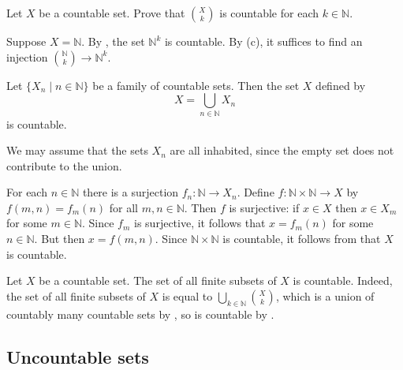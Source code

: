 
\begin{exercise} \label{exFiniteSubsetsCountableFixedSize}
Let $X$ be a countable set. Prove that $\binom{X}{k}$ is countable for each $k \in \mathbb{N}$.
\begin{backhint}
Suppose $X=\mathbb{N}$. By , the set $\mathbb{N}^k$ is countable. By (c), it suffices to find an injection $\binom{\mathbb{N}}{k} \to \mathbb{N}^k$.
\end{backhint}
\end{exercise}

\begin{theorem}
\label{thmCountableUnionOfCountableSetIsCountable}
Let $\{ X_n \mid n \in \mathbb{N} \}$ be a family of countable sets. Then the set $X$ defined by
\[ X = \bigcup_{n \in \mathbb{N}} X_n \]
is countable.
\end{theorem}

\begin{cproof}
We may assume that the sets $X_n$ are all inhabited, since the empty set does not contribute to the union.

For each $n \in \mathbb{N}$ there is a surjection $f_n : \mathbb{N} \to X_n$. Define $f : \mathbb{N} \times \mathbb{N} \to X$ by $f(m,n)=f_m(n)$ for all $m,n \in \mathbb{N}$. Then $f$ is surjective: if $x \in X$ then $x \in X_m$ for some $m \in \mathbb{N}$. Since $f_m$ is surjective, it follows that $x=f_m(n)$ for some $n \in \mathbb{N}$. But then $x=f(m,n)$. Since $\mathbb{N} \times \mathbb{N}$ is countable, it follows from  that $X$ is countable.
\end{cproof}

\begin{example}
\label{exCountableSubsetsOfCountableSetIsCountable}
Let $X$ be a countable set. The set of all finite subsets of $X$ is countable. Indeed, the set of all finite subsets of $X$ is equal to $\displaystyle \bigcup_{k \in \mathbb{N}} \binom{X}{k}$, which is a union of countably many countable sets by , so is countable by .
\end{example}

\subsection*{Uncountable sets}


